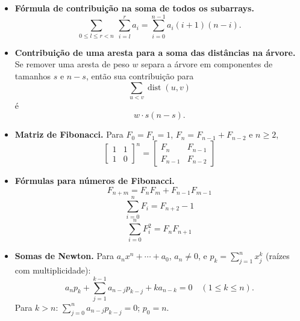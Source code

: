 \begin{itemize}[leftmargin=*,label={}]
		\ifextended
	\item \textbf{Fórmula de contribuição na soma de todos os subarrays.}
		\[
			\sum_{0\le l\le r<n}\ \sum_{i=l}^r a_i
			=
			\sum_{i=0}^{n-1} a_i(i+1)(n-i).
		\]
		\fi

		\ifextended
	\item \textbf{Contribuição de uma aresta para a soma das distâncias na árvore.}
		Se remover uma aresta de peso $w$ separa a árvore em componentes de tamanhos $s$ e $n-s$, então sua contribuição para
		\[
			\sum_{u<v}\operatorname{dist}(u,v)
		\]
		é
		\[
			w \cdot s(n-s).
		\]
		\fi

		\ifextended
	\item \textbf{Matriz de Fibonacci.}
		Para $F_0=F_1=1$, $F_n=F_{n-1}+F_{n-2}$ e $n\ge2$,
		\[
			\begin{bmatrix}
				1 & 1 \\
				1 & 0
			\end{bmatrix}^n = 
			\begin{bmatrix}
				F_n & F_{n-1} \\
				F_{n-1} & F_{n-2}
			\end{bmatrix}
		\]

	\item \textbf{Fórmulas para números de Fibonacci.}
		\[
			F_{n+m} = F_nF_m + F_{n-1}F_{m-1}
		\]
		\[
			\sum\limits_{i=0}^n F_i = F_{n+2} - 1
		\]
		\[
			\sum\limits_{i=0}^n F_i^2 = F_nF_{n+1}
		\]
		\fi

	\item \textbf{Somas de Newton.}
		Para $a_nx^n+\cdots+a_0$, $a_n\ne0$, e $p_k=\sum_{j=1}^n x_j^k$ (raízes com multiplicidade):
		\[
		 a_np_k+\sum_{j=1}^{k-1}a_{n-j}p_{k-j}+k a_{n-k}=0\quad(1\le k\le n).
		\]
		Para $k>n$: $\sum_{j=0}^n a_{n-j}p_{k-j}=0$; $p_0=n$.

\end{itemize}


